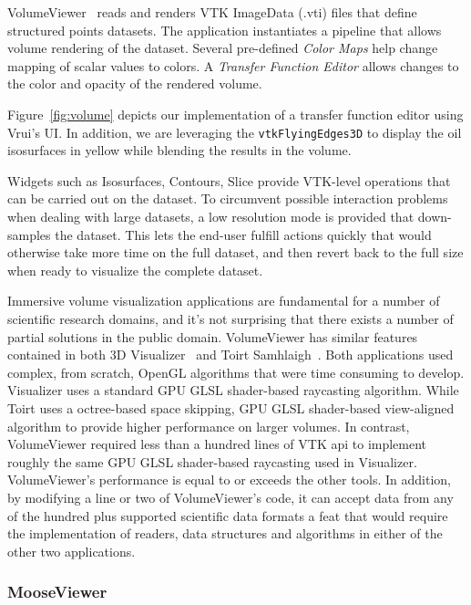 VolumeViewer~\cite{VolumeViewer} reads and renders VTK ImageData (.vti) files that define structured points datasets.  The application instantiates a pipeline that allows volume rendering of the dataset. Several pre-defined \textit{Color Maps} help change mapping of scalar values to colors. A  \textit{Transfer Function Editor} allows changes to the color and opacity of the rendered volume.

Figure~\ref{fig:volume} depicts our implementation of a transfer function editor using Vrui's UI. In addition, we are leveraging the \texttt{vtkFlyingEdges3D} to display the oil isosurfaces in yellow while blending the results in the volume.

Widgets such as Isosurfaces, Contours, Slice provide VTK-level operations that can be carried out on the dataset. To circumvent possible interaction problems when dealing with large datasets, a low resolution mode is provided that down-samples the dataset. This lets the end-user fulfill actions quickly that would otherwise take more time on the full dataset, and then revert back to the full size when ready to visualize the complete dataset.

Immersive volume visualization applications are fundamental for a number of scientific research domains, and it's not surprising that there exists a number of partial solutions in the public domain. VolumeViewer has similar features contained in both 3D Visualizer~\cite{Billen:2008} and Toirt Samhlaigh~\cite{O'Leary:2008}. Both applications used complex, from scratch, OpenGL algorithms that were time consuming to develop. Visualizer uses a standard GPU GLSL shader-based raycasting algorithm. While Toirt uses a octree-based space skipping, GPU GLSL shader-based view-aligned algorithm to provide higher performance on larger volumes. In contrast, VolumeViewer required less than a hundred lines of VTK api to implement roughly the same GPU GLSL shader-based raycasting used in Visualizer. VolumeViewer's performance is equal to or exceeds the other tools. In addition, by modifying a line or two of VolumeViewer's code, it can accept data from any of the hundred plus supported scientific data formats a feat that would require the implementation of readers, data structures and algorithms in either of the other two applications.

\subsubsection{MooseViewer}


